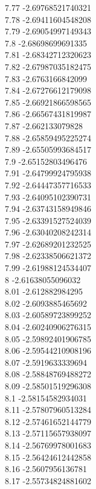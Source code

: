 {7.77	-2.69768521740321\\
7.78	-2.69411604548208\\
7.79	-2.69054997149343\\
7.8	-2.68698699691335\\
7.81	-2.68342712320623\\
7.82	-2.67987035182475\\
7.83	-2.6763166842099\\
7.84	-2.67276612179098\\
7.85	-2.66921866598565\\
7.86	-2.66567431819987\\
7.87	-2.662133079828\\
7.88	-2.65859495225274\\
7.89	-2.65505993684517\\
7.9	-2.65152803496476\\
7.91	-2.64799924795938\\
7.92	-2.64447357716533\\
7.93	-2.64095102390731\\
7.94	-2.63743158949846\\
7.95	-2.63391527524039\\
7.96	-2.63040208242314\\
7.97	-2.62689201232525\\
7.98	-2.62338506621372\\
7.99	-2.61988124534407\\
8	-2.61638055096032\\
8.01	-2.612882984295\\
8.02	-2.6093885465692\\
8.03	-2.60589723899252\\
8.04	-2.60240906276315\\
8.05	-2.59892401906785\\
8.06	-2.59544210908196\\
8.07	-2.5919633339694\\
8.08	-2.58848769488272\\
8.09	-2.58501519296308\\
8.1	-2.58154582934031\\
8.11	-2.57807960513284\\
8.12	-2.57461652144779\\
8.13	-2.57115657938097\\
8.14	-2.56769978001683\\
8.15	-2.56424612442858\\
8.16	-2.5607956136781\\
8.17	-2.55734824881602\\
}
